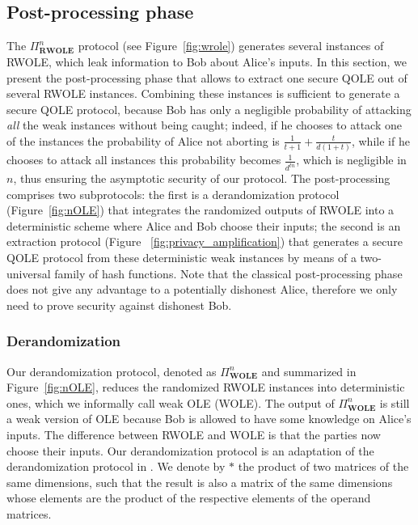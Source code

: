 \subsection{Post-processing phase}\label{qole_protocol}

The $\Pi^n_{\textbf{RWOLE}}$ protocol (see Figure~\ref{fig:wrole})  generates several instances of RWOLE, which leak information to Bob about Alice's inputs. In this section, we present the  post-processing phase that allows to extract one secure QOLE out of several RWOLE instances. Combining these instances is sufficient to generate a secure QOLE protocol, because Bob has only a negligible probability of attacking \textit{all} the weak instances without being caught; indeed, if he chooses to attack one of the instances the probability of Alice not aborting is $\frac{1}{t+1}+\frac{t}{d(1+t)}$, while if he chooses to attack all instances this probability becomes  $\frac{1}{d^{tn}}$, which is negligible in $n$, thus ensuring the asymptotic security of our protocol. The post-processing  comprises two subprotocols: the first is a derandomization protocol (Figure~\ref{fig:nOLE})  that integrates the randomized outputs of RWOLE into a deterministic scheme where Alice and Bob choose their inputs;   the second is an extraction protocol (Figure
~\ref{fig:privacy_amplification}) that generates a secure QOLE protocol from these deterministic weak instances by means of a two-universal family of hash functions.  Note that the classical post-processing phase does not give any advantage to a potentially dishonest Alice, therefore we only need to prove security against dishonest Bob.



\subsubsection{Derandomization}
Our derandomization protocol, denoted as  $\Pi^n_{\textbf{WOLE}}$ and summarized in Figure~\ref{fig:nOLE}, reduces the randomized RWOLE instances into deterministic ones, which we informally call  weak OLE (WOLE). The output of $\Pi^n_{\textbf{WOLE}}$ is still a weak version of OLE because Bob is allowed to have some knowledge on Alice's inputs. The difference between RWOLE and WOLE is that the parties now  choose their inputs. 
Our derandomization protocol is an adaptation of the derandomization protocol in \cite{DHNO19}. We denote by $*$ the product of two matrices of the same dimensions, such that the result is also a matrix of the same dimensions whose elements are the product of the respective elements of the operand matrices.

